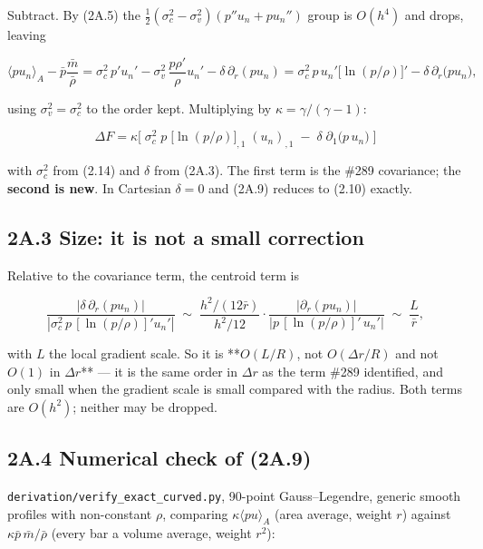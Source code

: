 \documentclass[11pt,a4paper]{article}
\begin{document}
Subtract. By (2A.5) the $\tfrac12(\sigma_c^2-\sigma_v^2)(p''u_n+pu_n'')$ group is
$O(h^4)$ and drops, leaving

\begin{equation*}
\langle pu_n\rangle_A-\bar p\frac{\bar m}{\bar\rho}
= \sigma_c^2\,p'u_n' - \sigma_v^2\,\frac{p\rho'}{\rho}u_n' - \delta\,\partial_r(pu_n)
= \sigma_c^2\,p\,u_n'\big[\ln(p/\rho)\big]' - \delta\,\partial_r\!\big(pu_n\big),
\end{equation*}

using $\sigma_v^2=\sigma_c^2$ to the order kept. Multiplying by
$\kappa=\gamma/(\gamma-1)$:

\begin{equation*}
\boxed{\;
\Delta F = \kappa\Big[\;\sigma_c^2\;p\;\big[\ln(p/\rho)\big]_{,1}\;(u_n)_{,1}
\;-\;\delta\;\partial_1\!\big(p\,u_n\big)\;\Big]
\;}
\tag{2A.9}
\end{equation*}

with $\sigma_c^2$ from (2.14) and $\delta$ from (2A.3). The first term is the
\#289 covariance; the \textbf{second is new}. In Cartesian $\delta=0$ and (2A.9)
reduces to (2.10) exactly.

\subsection*{2A.3 Size: it is not a small correction}

Relative to the covariance term, the centroid term is

\begin{equation*}
\frac{|\delta\,\partial_r(pu_n)|}{|\sigma_c^2\,p\,[\ln(p/\rho)]'u_n'|}
\;\sim\; \frac{h^2/(12\bar r)}{h^2/12}\cdot
\frac{|\partial_r(pu_n)|}{|p\,[\ln(p/\rho)]'\,u_n'|}
\;\sim\; \frac{L}{\bar r},
\tag{2A.10}
\end{equation*}

with $L$ the local gradient scale. So it is **$O(L/R)$, not $O(\Delta r/R)$ and
not $O(1)$ in $\Delta r$** — it is the same order in $\Delta r$ as the term
\#289 identified, and only small when the gradient scale is small compared with
the radius. Both terms are $O(h^2)$; neither may be dropped.

\subsection*{2A.4 Numerical check of (2A.9)}

\texttt{derivation/verify\_exact\_curved.py}, 90-point Gauss–Legendre, generic smooth
profiles with non-constant $\rho$, comparing
$\kappa\langle pu\rangle_A$ (area average, weight $r$) against
$\kappa\bar p\,\bar m/\bar\rho$ (every bar a volume average, weight $r^2$):
\end{document}
